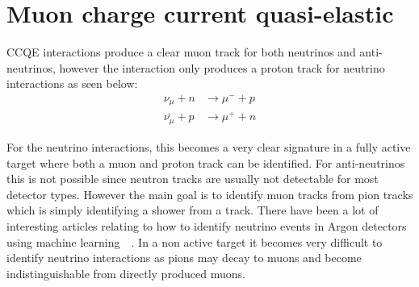 
\section{Muon charge current quasi-elastic}

CCQE interactions produce a clear muon track for both neutrinos and anti-neutrinos, however the interaction only produces a proton track for neutrino interactions as seen below:
\begin{align}
\nu_\mu + n &\rightarrow \mu^- + p\\
 \bar{\nu_\mu} + p &\rightarrow \mu^+ + n
\end{align}

For the neutrino interactions, this becomes a very clear signature in a fully active target where both a muon and proton track can be identified. For anti-neutrinos this is not possible since neutron tracks are usually not detectable for most detector types. However the main goal is to identify muon tracks from pion tracks which is simply identifying a shower from a track. There have been a lot of interesting articles relating to how to identify neutrino events in Argon detectors using machine learning~\cite{83Radovic2018}~\cite{84Adams}. In a non active target it becomes very difficult to identify neutrino interactions as pions may decay to muons and become indistinguishable from directly produced muons.



